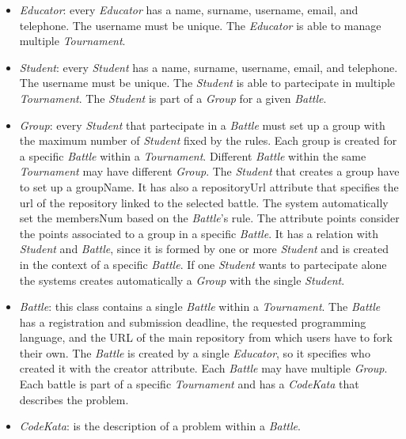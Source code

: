 \documentclass[12pt, a4paper]{report}
\begin{document}
    \begin{itemize}
        \item \textit{Educator}: every \textit{Educator} has a name, surname, username, email, and telephone. 
            The username must be unique. 
            The \textit{Educator} is able to manage multiple \textit{Tournament}. 
        \item \textit{Student}: every \textit{Student} has a name, surname, username, email, and telephone. 
            The username must be unique. 
            The \textit{Student} is able to partecipate in multiple \textit{Tournament}. 
            The \textit{Student} is part of a \textit{Group} for a given \textit{Battle}.     
        \item \textit{Group}: every \textit{Student} that partecipate in a \textit{Battle} must set up a group with the maximum number of \textit{Student} fixed by the rules. 
            Each group is created for a specific \textit{Battle} within a \textit{Tournament}. 
            Different \textit{Battle} within the same \textit{Tournament} may have different \textit{Group}. 
            The \textit{Student} that creates a group have to set up a groupName. 
            It has also a repositoryUrl attribute that specifies the url of the repository linked to the selected battle. 
            The system automatically set the membersNum based on the \textit{Battle}'s rule. 
            The attribute points consider the points associated to a group in a specific \textit{Battle}. 
            It has a relation with \textit{Student} and \textit{Battle}, since it is formed by one or more \textit{Student} and is created in the context of a specific \textit{Battle}. 
            If one \textit{Student} wants to partecipate alone the systems creates automatically a \textit{Group} with the single \textit{Student}. 
        \item \textit{Battle}: this class contains a single \textit{Battle} within a \textit{Tournament}.
            The \textit{Battle} has a registration and submission deadline, the requested programming language, and the URL of the main repository from which users have to fork their own.
            The \textit{Battle} is created by a single \textit{Educator}, so it specifies who created it with the creator attribute. 
            Each \textit{Battle} may have multiple \textit{Group}.
            Each battle is part of a specific \textit{Tournament} and has a \textit{CodeKata} that describes the problem. 
        \item \textit{CodeKata}: is the description of a problem within a \textit{Battle}. 

\end{itemize}
\end{document}
